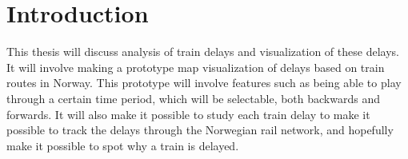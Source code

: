 
\chapter{Introduction}

This thesis will discuss analysis of train delays and visualization of these
delays. It will involve making a prototype map visualization of delays based on
train routes in Norway. This prototype will involve features such as being able
to play through a certain time period, which will be selectable, both backwards
and forwards. It will also make it possible to study each train delay to make
it possible to track the delays through the Norwegian rail network, and
hopefully make it possible to spot why a train is delayed.
